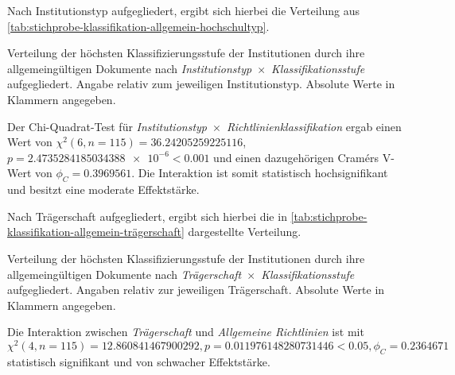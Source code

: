 Nach Institutionstyp aufgegliedert, ergibt sich hierbei die Verteilung aus \cref{tab:stichprobe-klassifikation-allgemein-hochschultyp}.
\begin{table}[!htbp]
	\caption{Verteilung der höchsten Klassifizierungsstufe der Institutionen durch ihre allgemeingültigen Dokumente nach \textit{Institutionstyp}~$\times$~\textit{Klassifikationsstufe} aufgegliedert.
    Angabe relativ zum jeweiligen Institutionstyp.
    Absolute Werte in Klammern angegeben.}
    
	\label{tab:stichprobe-klassifikation-allgemein-hochschultyp}
\end{table}
Der Chi-Quadrat-Test für \textit{Institutionstyp}~$\times$~\textit{Richtlinienklassifikation} ergab einen Wert von $\chi^2 (\num{6}, n=\num{115}) = \num[round-mode=places,round-precision=2]{36,24205259225116}$, $p = \num[round-mode=places,round-precision=2]{2,4735284185034388e-6}<\num{0.001}$ und einen dazugehörigen Cramérs V-Wert von $\phi_C=\num[round-mode=places,round-precision=2]{0.3969561}$.
Die Interaktion ist somit statistisch hochsignifikant und besitzt eine moderate Effektstärke.


Nach Trägerschaft aufgegliedert, ergibt sich hierbei die in \cref{tab:stichprobe-klassifikation-allgemein-trägerschaft} dargestellte Verteilung.
\begin{table}[!htbp]
	\caption{Verteilung der höchsten Klassifizierungsstufe der Institutionen durch ihre allgemeingültigen Dokumente nach \textit{Trägerschaft}~$\times$~\textit{Klassifikationsstufe} aufgegliedert.
    Angaben relativ zur jeweiligen Trägerschaft.
    Absolute Werte in Klammern angegeben.}
    
	\label{tab:stichprobe-klassifikation-allgemein-trägerschaft}
\end{table}
Die Interaktion zwischen \textit{Trägerschaft} und \textit{Allgemeine Richtlinien} ist mit $\chi^2 (\num{4}, n=\num{115}) = \num[round-mode=places,round-precision=2]{12,860841467900292}, p = \num[round-mode=places,round-precision=2]{0,011976148280731446}<\num{0.05},\phi_C=\num[round-mode=places,round-precision=2]{0.2364671}$ statistisch signifikant und von schwacher Effektstärke.

